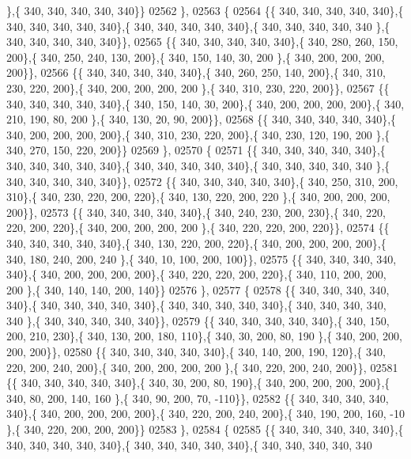 \begin{DoxyCode}
      \},\{ 340, 340, 340, 340, 340\}\}
02562 \},
02563 \{
02564 \{\{ 340, 340, 340, 340, 340\},\{ 340, 340, 340, 340, 340\},\{ 340, 340, 340, 340, 340\},\{ 340, 340, 340, 340, 340
      \},\{ 340, 340, 340, 340, 340\}\},
02565 \{\{ 340, 340, 340, 340, 340\},\{ 340, 280, 260, 150, 200\},\{ 340, 250, 240, 130, 200\},\{ 340, 150, 140,  30, 200
      \},\{ 340, 200, 200, 200, 200\}\},
02566 \{\{ 340, 340, 340, 340, 340\},\{ 340, 260, 250, 140, 200\},\{ 340, 310, 230, 220, 200\},\{ 340, 200, 200, 200, 200
      \},\{ 340, 310, 230, 220, 200\}\},
02567 \{\{ 340, 340, 340, 340, 340\},\{ 340, 150, 140,  30, 200\},\{ 340, 200, 200, 200, 200\},\{ 340, 210, 190,  80, 200
      \},\{ 340, 130,  20,  90, 200\}\},
02568 \{\{ 340, 340, 340, 340, 340\},\{ 340, 200, 200, 200, 200\},\{ 340, 310, 230, 220, 200\},\{ 340, 230, 120, 190, 200
      \},\{ 340, 270, 150, 220, 200\}\}
02569 \},
02570 \{
02571 \{\{ 340, 340, 340, 340, 340\},\{ 340, 340, 340, 340, 340\},\{ 340, 340, 340, 340, 340\},\{ 340, 340, 340, 340, 340
      \},\{ 340, 340, 340, 340, 340\}\},
02572 \{\{ 340, 340, 340, 340, 340\},\{ 340, 250, 310, 200, 310\},\{ 340, 230, 220, 200, 220\},\{ 340, 130, 220, 200, 220
      \},\{ 340, 200, 200, 200, 200\}\},
02573 \{\{ 340, 340, 340, 340, 340\},\{ 340, 240, 230, 200, 230\},\{ 340, 220, 220, 200, 220\},\{ 340, 200, 200, 200, 200
      \},\{ 340, 220, 220, 200, 220\}\},
02574 \{\{ 340, 340, 340, 340, 340\},\{ 340, 130, 220, 200, 220\},\{ 340, 200, 200, 200, 200\},\{ 340, 180, 240, 200, 240
      \},\{ 340,  10, 100, 200, 100\}\},
02575 \{\{ 340, 340, 340, 340, 340\},\{ 340, 200, 200, 200, 200\},\{ 340, 220, 220, 200, 220\},\{ 340, 110, 200, 200, 200
      \},\{ 340, 140, 140, 200, 140\}\}
02576 \},
02577 \{
02578 \{\{ 340, 340, 340, 340, 340\},\{ 340, 340, 340, 340, 340\},\{ 340, 340, 340, 340, 340\},\{ 340, 340, 340, 340, 340
      \},\{ 340, 340, 340, 340, 340\}\},
02579 \{\{ 340, 340, 340, 340, 340\},\{ 340, 150, 200, 210, 230\},\{ 340, 130, 200, 180, 110\},\{ 340,  30, 200,  80, 190
      \},\{ 340, 200, 200, 200, 200\}\},
02580 \{\{ 340, 340, 340, 340, 340\},\{ 340, 140, 200, 190, 120\},\{ 340, 220, 200, 240, 200\},\{ 340, 200, 200, 200, 200
      \},\{ 340, 220, 200, 240, 200\}\},
02581 \{\{ 340, 340, 340, 340, 340\},\{ 340,  30, 200,  80, 190\},\{ 340, 200, 200, 200, 200\},\{ 340,  80, 200, 140, 160
      \},\{ 340,  90, 200,  70, -110\}\},
02582 \{\{ 340, 340, 340, 340, 340\},\{ 340, 200, 200, 200, 200\},\{ 340, 220, 200, 240, 200\},\{ 340, 190, 200, 160, -10
      \},\{ 340, 220, 200, 200, 200\}\}
02583 \},
02584 \{
02585 \{\{ 340, 340, 340, 340, 340\},\{ 340, 340, 340, 340, 340\},\{ 340, 340, 340, 340, 340\},\{ 340, 340, 340, 340, 340

\end{DoxyCode}
